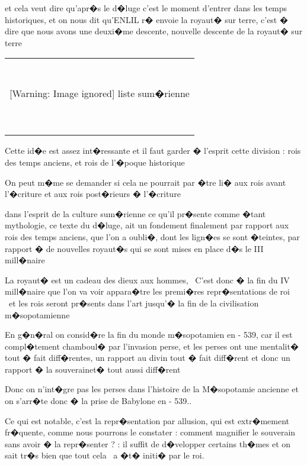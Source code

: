 \documentclass{article}
\begin{document}
et cela veut dire qu'apr�s le d�luge c'est le moment d'entrer dans les temps historiques, et on nous dit qu'ENLIL r� envoie la royaut� sur terre, c'est � dire que nous avons une deuxi�me descente, nouvelle descente de la royaut� sur terre

\begin{flushleft}
\tablefirsthead{}
\tablehead{}
\tabletail{}
\tablelasttail{}
\begin{supertabular}{m{20.119999cm}}
~
\\
{   [Warning: Image ignored] %
  liste sum�rienne }

~
\\
\end{supertabular}
\end{flushleft}
Cette id�e est assez int�ressante et il faut garder � l'esprit cette division : rois des temps anciens, et rois de l'�poque historique

On peut m�me se demander si cela ne pourrait par �tre li� aux rois avant l'�criture et aux rois post�rieurs � l'�criture

dans l'esprit de la culture sum�rienne ce qu'il pr�sente comme �tant mythologie, ce texte du d�luge, ait un fondement finalement par rapport aux rois des temps anciens, que l'on a oubli�, dont les lign�es se sont �teintes, par rapport � de nouvelles royaut�s qui se sont mises en place d�s le III mill�naire


\bigskip

La royaut� est un cadeau des dieux aux hommes, \ C'est donc � la fin du IV mill�naire que l'on va voir appara�tre les premi�res repr�sentations de roi \ et les rois seront pr�sents dans l'art jusqu'� la fin de la civilisation m�sopotamienne

En g�n�ral on consid�re la fin du monde m�sopotamien en - 539, car il est compl�tement chamboul� par l'invasion perse, et les perses ont une mentalit� tout � fait diff�rentes, un rapport au divin tout � fait diff�rent et donc un rapport � la souverainet� tout aussi diff�rent

Donc on n'int�gre pas les perses dans l'histoire de la M�sopotamie ancienne et on s'arr�te donc � la prise de Babylone en - 539..


\bigskip


\bigskip

Ce qui est notable, c'est la repr�sentation par allusion, qui est extr�mement fr�quente, comme nous pourrons le constater : comment magnifier le souverain sans avoir � la repr�senter ? : il suffit de d�velopper certains th�mes et on sait tr�s bien que tout cela \ a �t� initi� par le roi. 
\end{document}
